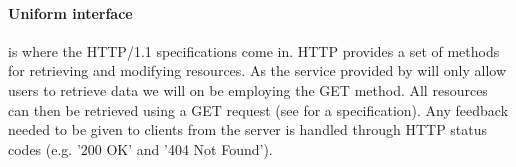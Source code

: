 \paragraph{Uniform interface} is where the HTTP/1.1 specifications come in.
HTTP provides a set of methods for retrieving and modifying resources.
As the service provided by \projectname{} will only allow users to retrieve data we will on be employing the GET method.
All resources can then be retrieved using a GET request (see  for a specification).
Any feedback needed to be given to clients from the server is handled through HTTP status codes (e.g. '200 OK' and '404 Not Found').
